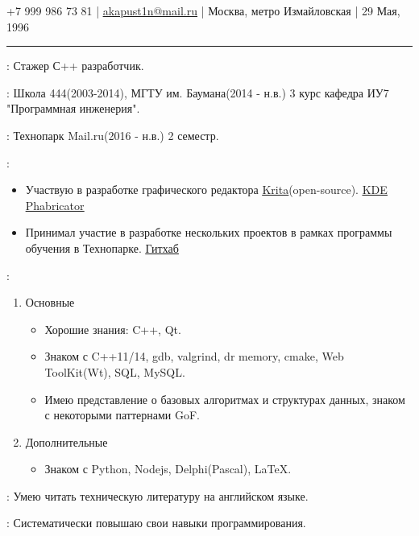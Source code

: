 \documentclass[11pt]{article}
\begin{document}
	
 
 \noindent +7 999 986 73 81          |   \href{mailto:akapust1n@mail.ru}{\uline{akapust1n@mail.ru}}  |  Москва, метро Измайловская  | 29 Мая, 1996 
 \vspace{0.5em}
 
 \hrule
 
 
 \vspace{1.5em}
 : Стажер С++ разработчик.
 \vspace{1em}
 
 : Школа 444(2003-2014), МГТУ им. Баумана(2014 - н.в.) 3 курс кафедра ИУ7 "Программная инженерия".
 
  \vspace{1em}
  
  : Технопарк Mail.ru(2016 - н.в.) 2 семестр.
  
  \vspace{1em}
  
  : 
  \begin{itemize}
  \item Участвую в разработке графического редактора \href{https://ru.wikipedia.org/wiki/Krita}{\uline{Krita}}(open-source). 
  \href{https://phabricator.kde.org/p/akapustin/}{\uline{KDE Phabricator}}
  \item Принимал участие в разработке нескольких проектов в рамках программы обучения в Технопарке.  \href{https://github.com/djkah11}{\uline{Гитхаб}}
  \end{itemize}
  \vspace{1em}
  :
\begin{enumerate}	
  	\item Основные
  	\begin{itemize}
  		\item Хорошие знания: C++, Qt.
  	    \item Знаком с C++11/14, gdb, valgrind, dr memory, cmake, Web ToolKit(Wt), SQL, MySQL.
  	    \item Имею представление о базовых алгоритмах и структурах данных, знаком с некоторыми паттернами GoF.
  	\end{itemize}
  	\item Дополнительные
  	\begin{itemize}
  		\item Знаком с Python, Nodejs, Delphi(Pascal), LaTeX.
  	\end{itemize}
  \end{enumerate}
  \vspace{1em}
  : Умею читать техническую литературу на английском языке.
  
   \vspace{1em}
   
   : Систематически повышаю свои навыки программирования.
  
  
  
\end{document}
